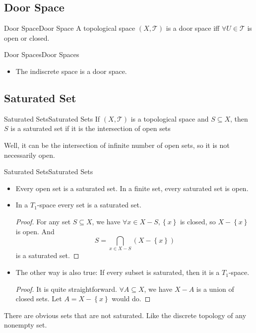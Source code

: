 \documentclass[../main.tex]{subfiles}
\begin{document}
\subsection{Door Space}
\begin{definition}{Door Space}{Door Space}
A topological space $(X,\mathcal{T})$ is a door space iff $\forall U\in \mathcal{T}$ is open or closed.
\end{definition}
\begin{example}{Door Spaces}{Door Spaces}
\begin{itemize}
\item The indiscrete space is a door space.
\end{itemize}
\end{example}

\subsection{Saturated Set}
\begin{definition}{Saturated Sets}{Saturated Sets}
If $(X,\mathcal{T})$ is a topological space and $S \subseteq X$, then $S$ is a saturated set if it is the intersection of open sets
\end{definition}
\begin{remark}
Well, it can be the intersection of infinite number of open sets, so it is not necessarily open.
\end{remark}

\begin{example}{Saturated Sets}{Saturated Sets}
\begin{itemize}
\item Every open set is a saturated set. In a finite set, every saturated set is open.
\item In a $T_1$-space every set is a saturated set.
\begin{proof}
For any set $S \subseteq X$, we have $\forall x\in X - S, \left\{ x \right\}$ is closed, so $X- \left\{ x \right\}$ is open. And
\begin{equation*}
S = \bigcap_{x\in X-S} \left(X - \left\{ x \right\}\right)
\end{equation*}
is a saturated set.
\end{proof}
\item The other way is also true: If every subset is saturated, then it is a $T_1$-space.
\begin{proof}
It is quite straightforward. $\forall A \subseteq X$, we have $X-A$ is a union of closed sets. Let $A = X - \left\{ x \right\}$ would do.
\end{proof}
\end{itemize}
\end{example}

There are obvious sets that are not saturated. Like the discrete topology of any nonempty set. 
\end{document}
